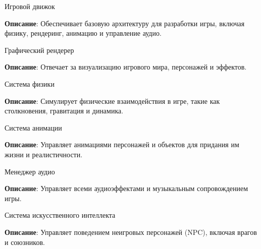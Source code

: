 
\begin{DoxyEnumerate}
\item Игровой движок
\end{DoxyEnumerate}
\begin{DoxyItemize}
\item {\bfseries{Описание}}\+: Обеспечивает базовую архитектуру для разработки игры, включая физику, рендеринг, анимацию и управление аудио.
\end{DoxyItemize}
\begin{DoxyEnumerate}
\item Графический рендерер
\end{DoxyEnumerate}
\begin{DoxyItemize}
\item {\bfseries{Описание}}\+: Отвечает за визуализацию игрового мира, персонажей и эффектов.
\end{DoxyItemize}
\begin{DoxyEnumerate}
\item Система физики
\end{DoxyEnumerate}
\begin{DoxyItemize}
\item {\bfseries{Описание}}\+: Симулирует физические взаимодействия в игре, такие как столкновения, гравитация и динамика.
\end{DoxyItemize}
\begin{DoxyEnumerate}
\item Система анимации
\end{DoxyEnumerate}
\begin{DoxyItemize}
\item {\bfseries{Описание}}\+: Управляет анимациями персонажей и объектов для придания им жизни и реалистичности.
\end{DoxyItemize}
\begin{DoxyEnumerate}
\item Менеджер аудио
\end{DoxyEnumerate}
\begin{DoxyItemize}
\item {\bfseries{Описание}}\+: Управляет всеми аудиоэффектами и музыкальным сопровождением игры.
\end{DoxyItemize}
\begin{DoxyEnumerate}
\item Система искусственного интеллекта
\end{DoxyEnumerate}
\begin{DoxyItemize}
\item {\bfseries{Описание}}\+: Управляет поведением неигровых персонажей (NPC), включая врагов и союзников.
\end{DoxyItemize}
